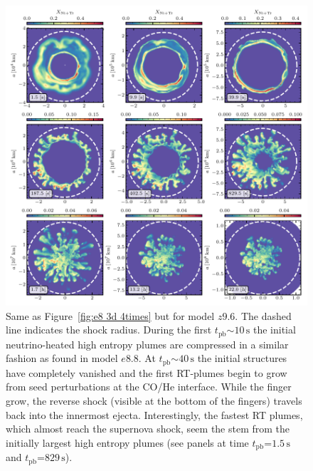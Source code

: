 \documentclass[fleqn,usenatbib]{mnras}
\newcommand{\tpb}{\ensuremath{t_{\text{pb}}}}
\newcommand{\s}{\ensuremath{\text{s}}}
\begin{document}
\begin{figure}%
 \centering
 \includegraphics[width=\textwidth,trim=0cm 0.0cm 0cm 0cm,clip]{pic/z9_3d_3x3_NiX.pdf}
 \caption{Same as Figure~\ref{fig:e8 3d 4times} but for model $z9.6$. The dashed line indicates the shock radius. During the first $\tpb\mathord{\sim} 10\,\s$ the initial neutrino-heated high entropy plumes are compressed in a similar fashion as found in model $e8.8$. At $\tpb\mathord{\sim}40\,\s$ the initial structures have completely vanished and the first RT-plumes begin to grow from seed perturbations at the CO/He interface. While the finger grow, the reverse shock (visible at the bottom of the fingers) travels back into the innermost ejecta. Interestingly, the fastest RT plumes, which almost reach the supernova shock, seem the stem from the initially largest high entropy plumes (see panels at time $\tpb\mathord{=}1.5\,\s$ and $\tpb\mathord{=}829\,\s$).
 }
 \label{fig:z9 3d 4times}
\end{figure}%
\end{document}
